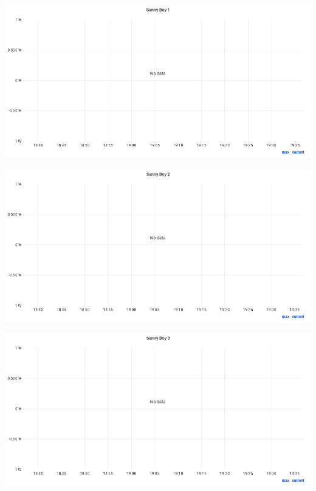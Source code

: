 \documentclass{article}
\begin{document}
\begin{center}
\par
\vspace{0.5cm}
\par
\vspace{0.5cm}
\includegraphics[width=\textwidth]{image44}
\par
\vspace{0.5cm}
\par
\vspace{0.5cm}
\includegraphics[width=\textwidth]{image45}
\par
\vspace{0.5cm}
\par
\vspace{0.5cm}
\includegraphics[width=\textwidth]{image46}

\end{center}
\end{document}

